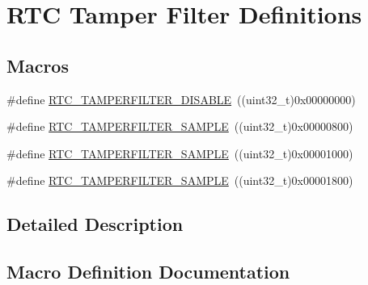 \hypertarget{group___r_t_c_ex___tamper___filter___definitions}{}\section{R\+TC Tamper Filter Definitions}
\label{group___r_t_c_ex___tamper___filter___definitions}
\subsection*{Macros}
\begin{DoxyCompactItemize}
\item 
\#define \hyperlink{group___r_t_c_ex___tamper___filter___definitions_ga0809aebfef5642f8f2a8d04b0aed4d98}{R\+T\+C\+\_\+\+T\+A\+M\+P\+E\+R\+F\+I\+L\+T\+E\+R\+\_\+\+D\+I\+S\+A\+B\+LE}~((uint32\+\_\+t)0x00000000)
\item 
\#define \hyperlink{group___r_t_c_ex___tamper___filter___definitions_ga4338b957d061fa9d1d51d403275fe391}{R\+T\+C\+\_\+\+T\+A\+M\+P\+E\+R\+F\+I\+L\+T\+E\+R\+\_\+S\+A\+M\+P\+LE}~((uint32\+\_\+t)0x00000800)
\item 
\#define \hyperlink{group___r_t_c_ex___tamper___filter___definitions_gabd9f9f1c669c073d58bd71257faa079e}{R\+T\+C\+\_\+\+T\+A\+M\+P\+E\+R\+F\+I\+L\+T\+E\+R\+\_\+S\+A\+M\+P\+LE}~((uint32\+\_\+t)0x00001000)
\item 
\#define \hyperlink{group___r_t_c_ex___tamper___filter___definitions_ga3689ed6d70107f0acc92aae8b13600bd}{R\+T\+C\+\_\+\+T\+A\+M\+P\+E\+R\+F\+I\+L\+T\+E\+R\+\_\+S\+A\+M\+P\+LE}~((uint32\+\_\+t)0x00001800)
\end{DoxyCompactItemize}


\subsection{Detailed Description}


\subsection{Macro Definition Documentation}
